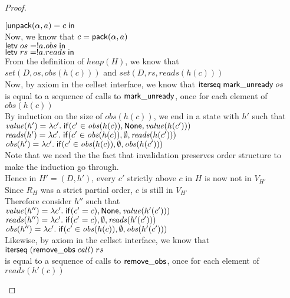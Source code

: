 \begin{proof}
\begin{tabbedproof}
\oooo $[\mathsf{unpack}({\alpha}, {a}) = {c} \;\mathsf{in}\;{}$ \\
\oooo Now, we know that $c = \mathsf{pack}({\alpha}, {a})$ \\
\oooo $\mathsf{letv}\;os = !a.obs\;\mathsf{in}\;$ \\
\oooo $\mathsf{letv}\;rs = !a.reads\;\mathsf{in}\;$ \\
\oooo From the definition of $\mathit{heap}(H)$, we know that  \\
\oooo $\mathit{set}(D, os, \mathit{obs}(h(c)))$ and $\mathit{set}(D, rs, \mathit{reads}(h(c)))$ \\
\oooo Now, by axiom in the cellset interface, we know that $\mathsf{iterseq\;mark\_unready}\;os$ \\
\ooox is equal to a sequence of calls to $\mathsf{mark\_unready}$, once for each element of $\mathit{obs}(h(c))$\\
\oooo By induction on the size of $\mathit{obs}(h(c))$, we end in a state with $h'$ such that \\
\oooox $\mathit{value}(h' ) = \lambda c'.\;\mathsf{if}({c'\in \mathit{obs}(h(c))}, {\mathsf{None}}, {\mathit{value}(h(c'))})$ \\
\oooox $\mathit{reads}(h') = \lambda c'.\;\mathsf{if}({c'\in \mathit{obs}(h(c))}, {\emptyset}, {\mathit{reads}(h(c'))})$ \\
\oooox $\mathit{obs}(h') = \lambda c'.\;\mathsf{if}({c'\in \mathit{obs}(h(c))}, {\emptyset}, {\mathit{obs}(h(c'))})$ \\
\oooo Note that we need the the fact that invalidation preserves order structure to  \\
\ooox make the induction go through. \\
\oooo Hence in $H' = (D,h')$, every $c'$ strictly above $c$ in $H$ is now not in $V_{H'}$ \\ 
\oooo Since $R_H$ was a strict partial order, $c$ is still in $V_{H'}$ \\
\oooo Therefore consider $h''$ such that   \\
\oooox $\mathit{value}(h'') = \lambda c'.\;\mathsf{if}({c' = c)}, {\mathsf{None}}, {\mathit{value}(h'(c'))})$ \\
\oooox $\mathit{reads}(h'') = \lambda c'.\;\mathsf{if}({c' = c)}, {\emptyset}, {\mathit{reads}(h'(c'))})$ \\
\oooox $\mathit{obs}(h'') = \lambda c'.\;\mathsf{if}({c'\in \mathit{obs}(h(c))}, {\emptyset}, {\mathit{obs}(h'(c'))})$ \\
\oooo Likewise, by axiom in the cellset interface, we know that $\mathsf{iterseq}\;(\mathsf{remove\_obs}\;cell)\;rs$ \\
\ooox is equal to a sequence of calls to $\mathsf{remove\_obs}$, once for each element of $\mathit{reads}(h'(c))$\\

\end{tabbedproof}
\end{proof}
